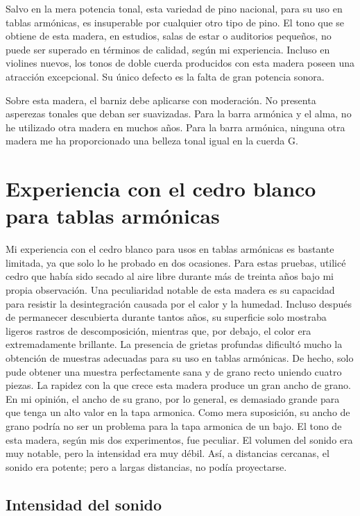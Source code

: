 \documentclass[12pt]{book}
\begin{document}
Salvo en la mera potencia tonal, esta variedad de pino nacional, para su uso en tablas armónicas, es insuperable por cualquier otro tipo de pino. El tono que se obtiene de esta madera, en estudios, salas de estar o auditorios pequeños, no puede ser superado en términos de calidad, según mi experiencia. Incluso en violines nuevos, los tonos de doble cuerda producidos con esta madera poseen una atracción excepcional. Su único defecto es la falta de gran potencia sonora. 

Sobre esta madera, el barniz debe aplicarse con moderación. No presenta asperezas tonales que deban ser suavizadas. Para la barra armónica y el alma, no he utilizado otra madera en muchos años. Para la barra armónica, ninguna otra madera me ha proporcionado una belleza tonal igual en la cuerda G.

\section*{Experiencia con el cedro blanco para tablas armónicas}

Mi experiencia con el cedro blanco para usos en tablas armónicas es bastante limitada, ya que solo lo he probado en dos ocasiones. Para estas pruebas, utilicé cedro que había sido secado al aire libre durante más de treinta años bajo mi propia observación. Una peculiaridad notable de esta madera es su capacidad para resistir la desintegración causada por el calor y la humedad. Incluso después de permanecer descubierta durante tantos años, su superficie solo mostraba ligeros rastros de descomposición, mientras que, por debajo, el color era extremadamente brillante. La presencia de grietas profundas dificultó mucho la obtención de muestras adecuadas para su uso en tablas armónicas. De hecho, solo pude obtener una muestra perfectamente sana y de grano recto uniendo cuatro piezas. La rapidez con la que crece esta madera produce un gran ancho de grano. En mi opinión, el ancho de su grano, por lo general, es demasiado grande para que tenga un alto valor en la tapa armonica. Como mera suposición, su ancho de grano podría no ser un problema para la tapa armonica de un bajo. El tono de esta madera, según mis dos experimentos, fue peculiar. El volumen del sonido era muy notable, pero la intensidad era muy débil. Así, a distancias cercanas, el sonido era potente; pero a largas distancias, no podía proyectarse.

\subsection*{Intensidad del sonido}
\end{document}
